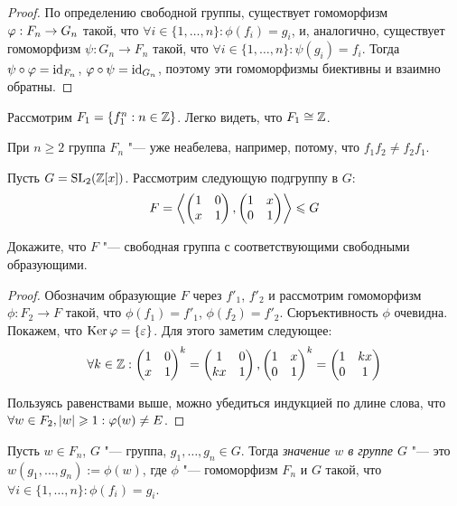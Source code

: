 \begin{proof}
	По определению свободной группы, существует гомоморфизм $\phi: F_n \hm\to G_n$ такой, что $\forall i \in \{1, \dotsc, n\}: \phi(f_i) = g_i$, и, аналогично, существует гомоморфизм $\psi: G_n \to F_n$ такой, что $\forall i \in \{1, \dotsc, n\}: \psi(g_i) = f_i$. Тогда $\psi \circ \varphi = \operatorname{id}_{F_n}$, $\varphi \circ \psi = \operatorname{id}_{G_n}$, поэтому эти гомоморфизмы биективны и взаимно обратны.
\end{proof}

\begin{example}
	Рассмотрим $F_1 = \{f_1^n: n \in \mathbb{Z}\}$. Легко видеть, что $F_1 \cong \mathbb{Z}$.
\end{example}

\begin{note}
	При $n \ge 2$ группа $F_n$ "--- уже неабелева, например, потому, что $f_1f_2 \ne f_2f_1$.
\end{note}

\begin{exercise}
	Пусть $G = \operatorname{SL}_2(\mathbb{Z}[x])$. Рассмотрим следующую подгруппу в $G$:
	\[F = \left\langle \begin{pmatrix}1&0\\x&1\end{pmatrix}, \begin{pmatrix}1&x\\0&1\end{pmatrix} \right\rangle \leqslant G\]
	
	Докажите, что $F$ "--- свободная группа с соответствующими свободными образующими.
\end{exercise}

\begin{proof}
	Обозначим образующие $F$ через $f'_1$, $f'_2$ и рассмотрим гомоморфизм $\phi: F_2 \to F$ такой, что $\phi(f_1) = f'_1$, $\phi(f_2) = f'_2$. Сюръективность $\phi$ очевидна. Покажем, что $\operatorname{Ker}\varphi = \{\varepsilon\}$. Для этого заметим следующее:
	\[\forall k \in \mathbb{Z}: \begin{pmatrix}1&0\\x&1\end{pmatrix}^k = \begin{pmatrix}1&0\\kx&1\end{pmatrix}, \begin{pmatrix}1&x\\0&1\end{pmatrix}^k = \begin{pmatrix}1&kx\\0&1\end{pmatrix}\]
	
	Пользуясь равенствами выше, можно убедиться индукцией по длине слова, что $\forall w \hm\in F_2, |w| \ge 1: \phi(w) \ne E$.
\end{proof}

\begin{definition}
	Пусть $w \in F_n$, $G$ "--- группа, $g_1, \dotsc, g_n \in G$. Тогда \textit{значение $w$ в группе $G$} "--- это $w(g_1, \dotsc, g_n) := \phi(w)$, где $\phi$ "--- гомоморфизм $F_n$ и $G$ такой, что $\forall i \in \{1, \dotsc, n\}: \phi(f_i) = g_i$.
\end{definition}